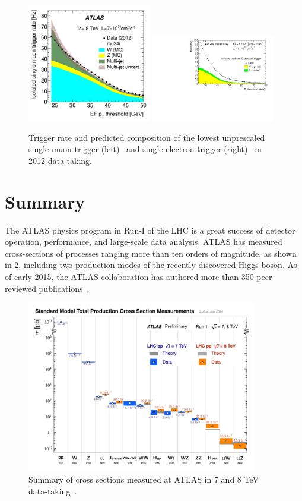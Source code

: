 \begin{figure}[tp]
  \centering
  \includegraphics[width=0.48\textwidth]{figures/TRIG-2012-03/fig_04b}
  \includegraphics[width=0.48\textwidth]{figures/trigger/Plots2014ICHEP_Fig2a}
  \caption{Trigger rate and predicted composition of the lowest unprescaled single muon trigger (left)~\cite{TRIG-2012-03} and single electron trigger (right)~\cite{EgammaTriggerPublicResults} in 2012 data-taking.}
  \label{fig:prospects-trigger-HLT}
\end{figure}

\section{Summary}

The ATLAS physics program in Run-I of the LHC is a great success of detector operation, performance, and large-scale data analysis. ATLAS has measured cross-sections of processes ranging more than ten orders of magnitude, as shown in \cref{fig:atlas-measurements}, including two production modes of the recently discovered Higgs boson. As of early 2015, the ATLAS collaboration has authored more than 350 peer-reviewed publications~\cite{ATLASPublications}.

\begin{figure}[tp]
  \centering
  \includegraphics[width=0.90\textwidth]{figures/lhc-atlas/ATLAS_a_SMSummary_TotalXsect}
  \caption{Summary of cross sections measured at ATLAS in 7 and 8 TeV data-taking~\cite{2015.atlas-summary-SM}.}
  \label{fig:atlas-measurements}
\end{figure}


